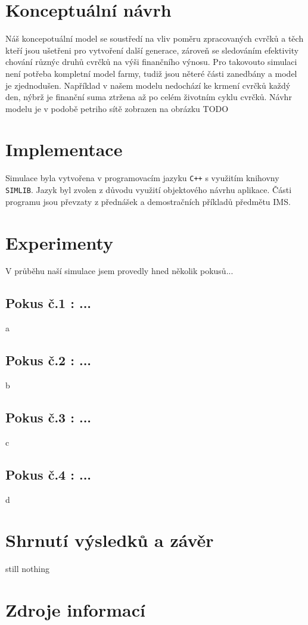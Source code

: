 \documentclass[a4paper, 12pt]{article}
\begin{document}
\newpage

\section{Konceptuální návrh}
Náš koncepotuální model se soustředí na vliv poměru zpracovaných cvrčků a těch kteří jsou ušetřeni pro vytvoření další generace, zároveň se sledováním efektivity chování různýc druhů cvrčků na výši finančního výnosu. Pro takovouto simulaci není potřeba kompletní model farmy, tudiž jsou něteré části zanedbány a model je zjednodušen. Například v našem modelu nedochází ke krmení cvrčků každý den, nýbrž je finanční suma ztržena až po celém životním cyklu cvrčků. Návhr modelu je v podobě petriho sítě zobrazen na obrázku TODO

\section{Implementace}
Simulace byla vytvořena v programovacím jazyku \texttt{C++} s využitím knihovny \texttt{SIMLIB}. Jazyk byl zvolen z důvodu využití objektového návrhu aplikace. Části programu jsou převzaty z přednášek a demostračních příkladů předmětu IMS. 

\section{Experimenty}
V průběhu naší simulace jsem provedly hned několik pokusů...

\subsection{Pokus č.1 : ...}
a
\subsection{Pokus č.2 : ...}
b
\subsection{Pokus č.3 : ...}
c
\subsection{Pokus č.4 : ...}
d
\section{Shrnutí výsledků a závěr}
still nothing

\section{Zdroje informací}
\setlength\parindent{0pt}
\end{document}
